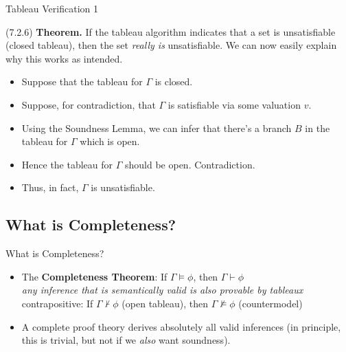 \begin{frame}{Tableau Verification 1}

(7.2.6) \textbf{Theorem.} If the tableau algorithm indicates that a set is unsatisfiable (closed tableau), then the set \emph{really is} unsatisfiable. 
We can now easily explain why this works as intended.

\bigskip

\begin{itemize}
\itemsep=16pt
	
		\item Suppose that the tableau for $\Gamma$ is closed.
		
		\item Suppose, for contradiction, that $\Gamma$ is satisfiable via some valuation $v$.
		
		\item Using the Soundness Lemma, we can infer that there's a branch $B$ in the tableau for $\Gamma$ which is open.
	
		\item Hence the tableau for $\Gamma$ should be open. Contradiction.
		
		\item Thus, in fact, $\Gamma$ is unsatisfiable.
	
	\end{itemize}

\end{frame}


\subsection{What is Completeness?}
\begin{frame}{What is Completeness?}

	\begin{itemize}%
	\itemsep=16pt
		
	\item The \textbf{Completeness Theorem}: If $\Gamma\vDash\phi$, then $\Gamma\vdash\phi$
	\\
	\alert{\emph{\small{any inference that is semantically valid is also provable by tableaux}}}
	\\
	{\small contrapositive: If $\Gamma\nvdash\phi$ (open tableau), then $\Gamma\nvDash\phi$ (countermodel)}

	\item A complete proof theory derives absolutely all valid inferences (in principle, this is trivial, but not if we \emph{also} want soundness).

	\end{itemize}

\end{frame}

